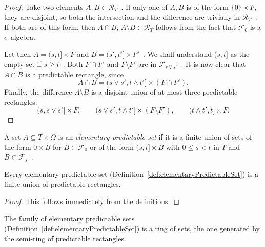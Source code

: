 \begin{proof}
  Take two elements $A, B \in \mathcal{R}_T$~.
  If only one of $A, B$ is of the form $\{0\} \times F$,
  they are disjoint, so both the intersection and the difference
  are trivially in $\mathcal{R}_T$~.
  If both are of this form, then $A\cap B$, $A\setminus B\in\mathcal{R}_T$
  follows from the fact that $\mathcal{F}_0$ is a $\sigma$-algebra.

  Let then $A=(s, t] \times F$ and $B=(s', t'] \times F'$~.
  We shall understand $(s,t]$ as the empty set if $s \ge t$~.
  Both $F \cap F'$ and $F \setminus F'$ are in $\mathcal{F}_{s \vee s'}$~.
  It is now clear that $A\cap B$ is a predictable rectangle, since
  \[
  A \cap B
  =
  (s \vee s', t \wedge t'] \times (F \cap F').
  \]
  Finally, the difference $A \setminus B$
  is a disjoint union of at most three predictable rectangles:
  \[
  (s, s \vee s'] \times F,
  \qquad
  (s \vee s', t \wedge t'] \times (F \setminus F'),
  \qquad
  (t \wedge t', t] \times F.
  \]
\end{proof}

\begin{definition}\label{def:elementaryPredictableSet}
  \leanok
A set $A \subseteq T \times \Omega$ is an \emph{elementary predictable set} if it is a finite union of sets of the form ${0} \times B$ for $B \in \mathcal{F}_0$ or of the form $(s, t] \times B$ with $0 \le s < t$ in $T$ and $B \in \mathcal{F}_s$~.
\end{definition}


\begin{lemma}\label{lem:predictableRectangles_generate_elementaryPredictableSets}
  Every elementary predictable set (Definition~\ref{def:elementaryPredictableSet})
  is a finite union of predictable rectangles.
\end{lemma}

\begin{proof}
  This follows immediately from the definitions.
\end{proof}

\begin{lemma}\label{lem:elementaryPredictableSets_isSetRing_of}
  The family of elementary predictable sets (Definition~\ref{def:elementaryPredictableSet})
  is a ring of sets, the one generated by the semi-ring of predictable rectangles.
\end{lemma}

